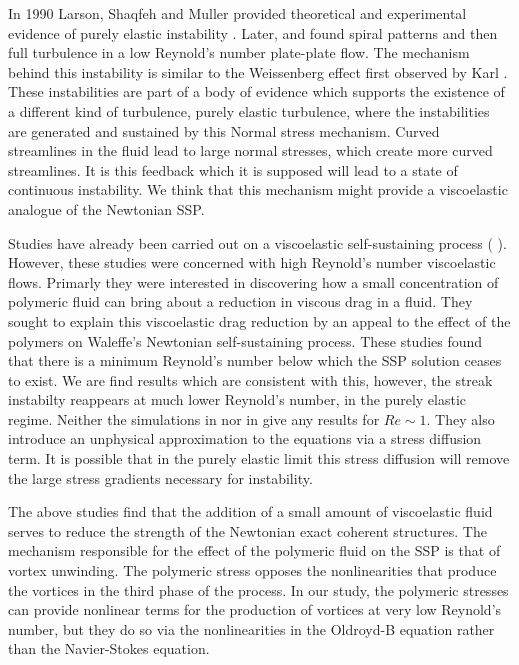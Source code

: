 \documentclass{jfm}
\begin{document}
In 1990 Larson, Shaqfeh and Muller provided theoretical and experimental
evidence of purely elastic instability \cite{Larson1990}. Later,
\cite{Byars1994} and \cite{Groisman2000} found spiral patterns and
then full turbulence in a low Reynold's number plate-plate flow. The mechanism
behind this instability is similar to the Weissenberg effect first observed by
Karl \cite{Weissenberg1947}. These instabilities are part of a body of evidence
which supports the existence of a different kind of turbulence, purely elastic
turbulence, where the instabilities are generated and sustained by this Normal
stress mechanism. Curved streamlines in the fluid lead to large normal
stresses, which create more curved streamlines. It is this feedback which it is
supposed will lead to a state of continuous instability.  We think that this
mechanism might provide a viscoelastic analogue of the Newtonian SSP.

Studies have already been carried out on a viscoelastic self-sustaining process
( \cite{Stone2004, Stone2002, Sureshkumar1997}). However, these studies were
concerned with high Reynold's number viscoelastic flows. Primarly they were
interested in discovering how a small concentration of polymeric fluid can
bring about a reduction in viscous drag in a fluid. They sought to explain this
viscoelastic drag reduction by an appeal to the effect of the polymers on
Waleffe's Newtonian self-sustaining process. These studies found that there is
a minimum Reynold's number below which the SSP solution ceases to exist. We are
find results which are consistent with this, however, the streak instabilty
reappears at much lower Reynold's number, in the purely elastic regime. Neither
the simulations in \cite{Sureshkumar1997} nor in \cite{Stone2004} give any
results for $Re\sim1$. They also introduce an unphysical approximation to the
equations via a stress diffusion term. It is possible that in the purely
elastic limit this stress diffusion will remove the large stress gradients
necessary for instability. 

The above studies find that the addition of a small amount of viscoelastic
fluid serves to reduce the strength of the Newtonian exact coherent structures.
The mechanism responsible for the effect of the polymeric fluid on the SSP is
that of vortex unwinding. The polymeric stress opposes the nonlinearities that
produce the vortices in the third phase of the process. In our study, the
polymeric stresses can provide nonlinear terms for the production of vortices
at very low Reynold's number, but they do so via the nonlinearities in the
Oldroyd-B equation rather than the Navier-Stokes equation.
\end{document}
